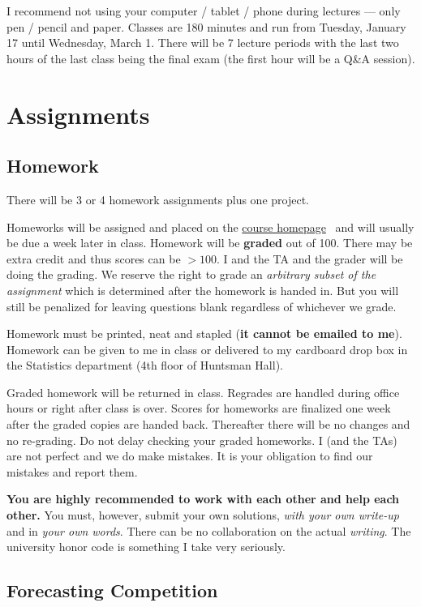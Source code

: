 \documentclass[12pt]{article}
\newcommand{\ingreen}[1]{\color{green}\textbf{#1} \color{black}}
\newcommand{\coursewebpage}{\href{https://github.com/kapelner/Wharton_Stat_422_722}{course homepage}}
\begin{document}
I recommend not using your computer / tablet / phone during lectures --- only pen / pencil and paper. Classes are 180 minutes and run from Tuesday, January 17 until Wednesday, March 1. There will be 7 lecture periods with the last two hours of the last class being the final exam (the first hour will be a Q\&A session).

\section*{Assignments}

\subsection*{Homework}

There will be 3 or 4 homework assignments plus one project. 

Homeworks will be assigned and placed on the \coursewebpage~ and will usually be due a week later in class. Homework will be \textbf{graded} out of 100. There may be extra credit and thus scores can be $> 100$. I and the TA and the grader will be doing the grading. We reserve the right to grade an \textit{arbitrary subset of the assignment} which is determined after the homework is handed in. But you will still be penalized for leaving questions blank regardless of whichever we grade.

Homework must be printed, neat and stapled (\textbf{it cannot be emailed to me}). Homework can be given to me in class or delivered to my cardboard drop box in the Statistics department (4th floor of Huntsman Hall).

Graded homework will be returned in class. Regrades are handled during office hours or right after class is over. Scores for homeworks are finalized one week after the graded copies are handed back. Thereafter there will be no changes and no re-grading. Do not delay checking your graded homeworks. I (and the TAs) are not perfect and we do make mistakes. It is your obligation to find our mistakes and report them.

\ingreen{You are highly recommended to work with each other and help each other.} You must, however, submit your own solutions, \textit{with your own write-up} and in \textit{your own words}. There can be no collaboration on the actual \textit{writing}. The university honor code is something I take very seriously.


\subsection*{Forecasting Competition}
\end{document}
